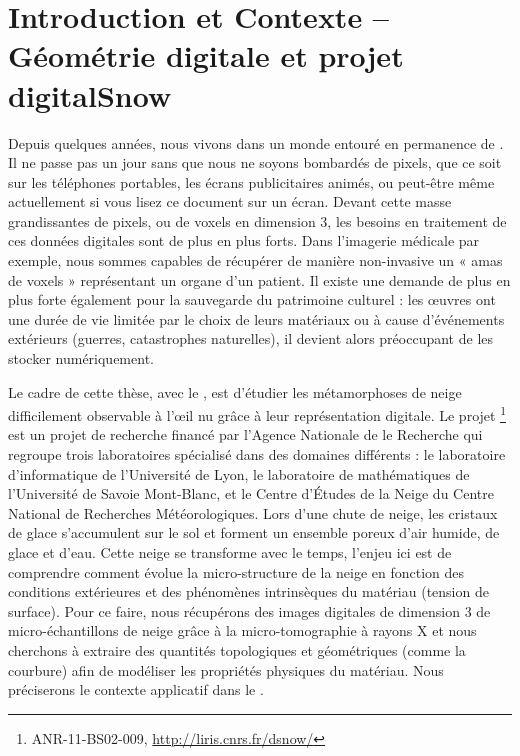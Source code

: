 %
\chapter{Introduction et Contexte -- Géométrie digitale et projet digitalSnow}
\label{sec:introduction}


\setcounter{minitocdepth}{3}
\minitoc

\newpage

Depuis quelques années, nous vivons dans un monde entouré en permanence de
. Il ne passe pas un jour sans que nous ne soyons
bombardés de pixels, que ce soit sur les téléphones portables, les écrans
publicitaires animés, ou peut-être même actuellement si vous lisez ce document
sur un écran. Devant cette masse grandissantes de pixels, ou de voxels en
dimension 3, les besoins en traitement de ces données digitales sont de plus en
plus forts. Dans l'imagerie médicale par exemple, nous sommes capables de
récupérer de manière non-invasive un « amas de voxels » représentant un organe
d'un patient. Il existe une demande de plus en plus forte également pour la
sauvegarde du patrimoine culturel : les œuvres ont une durée de vie limitée par
le choix de leurs matériaux ou à cause d’événements extérieurs (guerres,
catastrophes naturelles), il devient alors préoccupant de les stocker
numériquement.

Le cadre de cette thèse, avec le , est d'étudier
les métamorphoses de neige difficilement observable à l'œil nu grâce à leur
représentation digitale. Le projet \digitalSnow\footnote{ANR-11-BS02-009,
\url{http://liris.cnrs.fr/dsnow/}} est un projet de recherche financé par
l'Agence Nationale de le Recherche qui regroupe trois laboratoires spécialisé
dans des domaines différents : le laboratoire d'informatique
\textsc{} de l'Université de Lyon, le laboratoire de
mathématiques \textsc{} de l'Université de Savoie Mont-Blanc, et
le Centre d'Études de la Neige \textsc{} du Centre National de
Recherches Météorologiques. Lors d'une chute de neige, les cristaux de glace
s'accumulent sur le sol et forment un ensemble poreux d'air humide, de glace et
d'eau. Cette neige se transforme avec le temps, l'enjeu ici est de comprendre
comment évolue la micro-structure de la neige en fonction des conditions
extérieures et des phénomènes intrinsèques du matériau (tension de surface). Pour
ce faire, nous récupérons des images digitales de dimension 3 de
micro-échantillons de neige grâce à la micro-tomographie à rayons X et nous
cherchons à extraire des quantités topologiques et géométriques (comme la
courbure) afin de modéliser les propriétés physiques du matériau. Nous
préciserons le contexte applicatif dans le
.

